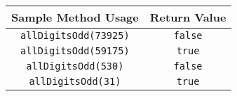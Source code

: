\documentclass[12pt]{article}
\begin{document}
\begin{center}
\begin{tabular}{| c | c |}
\hline\rule{0pt}{4ex}
Sample Method Usage & Return Value \\
\hline\rule{0pt}{4ex}
\texttt{allDigitsOdd(73925)} & \texttt{false}\\
\hline\rule{0pt}{4ex}
\texttt{allDigitsOdd(59175)} & \texttt{true}\\
\hline\rule{0pt}{4ex}
\texttt{allDigitsOdd(530)} & \texttt{false}\\
\hline\rule{0pt}{4ex}
\texttt{allDigitsOdd(31)} & \texttt{true}\\
\hline
\end{tabular}
\end{center}
\end{document}
